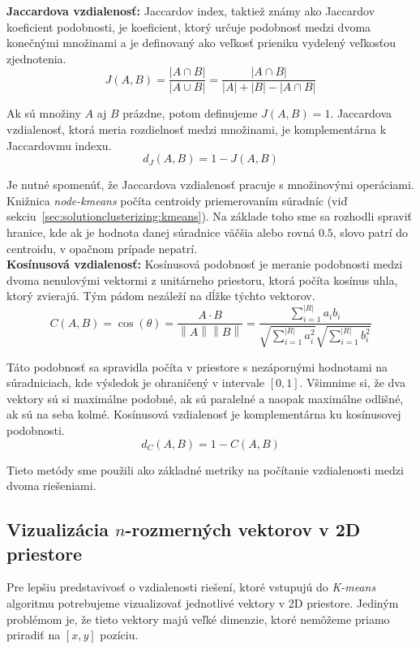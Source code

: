 \noindent\textbf{Jaccardova vzdialenosť:} Jaccardov index, taktiež známy ako Jaccardov
koeficient podobnosti, je koeficient, ktorý určuje podobnosť medzi dvoma konečnými množinami
a je definovaný ako veľkosť prieniku vydelený veľkosťou zjednotenia.
$$J(A,B) = \frac{|A\cap B|}{|A\cup B|} = \frac{|A\cap B|}{|A| + |B| - |A\cap B|}$$

Ak sú množiny $A$ aj $B$ prázdne, potom definujeme $J(A,B) = 1$.
Jaccardova vzdialenosť, ktorá meria rozdielnosť medzi množinami, je komplementárna
k Jaccardovmu indexu.
$$d_J(A,B) = 1 - J(A,B)$$

Je nutné spomenúť, že Jaccardova vzdialenosť pracuje s množinovými operáciami. Knižnica
\textit{node-kmeans} počíta centroidy priemerovaním súradníc
(viď sekciu~\ref{sec:solutionclusterizing:kmeans}). Na základe toho sme sa rozhodli
spraviť hranice, kde ak je hodnota danej súradnice väčšia alebo rovná $0.5$, slovo
patrí do centroidu, v opačnom prípade nepatrí.\\

\noindent\textbf{Kosínusová vzdialenosť:} Kosínusová podobnosť je meranie podobnosti
medzi dvoma nenulovými vektormi z unitárneho priestoru, ktorá počíta kosínus uhla,
ktorý zvierajú. Tým pádom nezáleží na dĺžke týchto vektorov.
$$C(A,B)=\cos(\theta)=
\frac{A\cdot B}{\left\lVert A \right\rVert \left\lVert B \right\rVert}=
\frac{\displaystyle \sum_{i=1}^{|R|} a_ib_i}{\sqrt{\displaystyle \sum_{i=1}^{|R|} a_i^2} \sqrt{\displaystyle \sum_{i=1}^{|R|} b_i^2}}$$

Táto podobnosť sa spravidla počíta v priestore s nezápornými hodnotami na súradniciach,
kde výsledok je ohraničený v intervale $[0,1]$. Všimnime si, že dva vektory sú si
maximálne podobné, ak sú paralelné a naopak maximálne odlišné, ak sú na seba kolmé.
Kosínusová vzdialenosť je komplementárna ku kosínusovej podobnosti.
$$d_C(A,B)=1-C(A,B)$$

Tieto metódy sme použili ako základné metriky na počítanie vzdialenosti medzi
dvoma riešeniami.

\subsection{Vizualizácia $n$-rozmerných vektorov v 2D priestore}
\label{sec:solutionclusterizing:tsne}

Pre lepšiu predstavivosť o vzdialenosti riešení, ktoré vstupujú do \textit{K-means}
algoritmu potrebujeme vizualizovať jednotlivé vektory v 2D priestore. Jediným
problémom je, že tieto vektory majú veľké dimenzie, ktoré nemôžeme priamo priradiť
na $[x,y]$ pozíciu.

